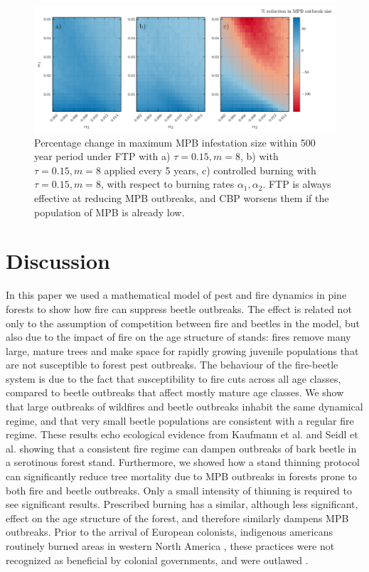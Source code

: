 \begin{figure}
  \includegraphics[width=\textwidth]{chapter_3/a1_a2_trim_gain.pdf}
  \caption[Percentage change in maximum MPB infestation size within 500 year period under FTP]{Percentage change in maximum MPB infestation size within 500 year period under FTP with a) $\tau = 0.15, m = 8$, b) with $\tau = 0.15, m = 8$ applied every 5 years, c) controlled burning with $\tau = 0.15, m = 8$,  with respect to burning rates $\alpha_1,\alpha_2$. FTP is always effective at reducing MPB outbreaks, and CBP worsens them if the population of MPB is already low.}
  \label{trim_gain}
\end{figure}
\section{Discussion}

In this paper we used a mathematical model of pest and fire dynamics in pine forests to show how fire can suppress beetle outbreaks. The effect is related not only to the assumption of competition between fire and beetles in the model, but also due to the impact of fire on the age structure of stands: fires remove many large, mature trees and make space for rapidly growing juvenile populations that are not susceptible to forest pest outbreaks. The behaviour of the fire-beetle system is due to the fact that susceptibility to fire cuts across all age classes, compared to beetle outbreaks that affect mostly mature age classes.  We show that large outbreaks of wildfires and beetle outbreaks inhabit the same dynamical regime, and that very small beetle populations are consistent with a regular fire regime.  These results echo ecological evidence from Kaufmann et al.\cite{kaufmann2008status} and Seidl et al.\cite{seidl2016spatial} showing that a consistent fire regime can dampen outbreaks of bark beetle in a serotinous forest stand.  Furthermore, we showed how a stand thinning protocol can significantly reduce tree mortality due to MPB outbreaks in forests prone to both fire and beetle outbreaks. Only a small intensity of thinning is required to see significant results. Prescribed burning has a similar, although less significant, effect on the age structure of the forest, and therefore similarly dampens MPB outbreaks. Prior to the arrival of European colonists, indigenous americans routinely burned areas in western North America \cite{barrett1982indian}, these practices were not recognized as beneficial by colonial governments, and were outlawed \cite{boyd1999indians}.

